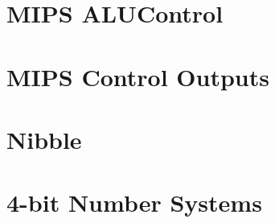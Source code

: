 \documentclass[11pt]{article}
\begin{document}
\begin{minipage}[t]{\linewidth}
    \begin{minipage}[t]{0.5\textwidth}
        \section*{MIPS ALUControl}
        
    \end{minipage}
    \begin{minipage}[t]{0.28\textwidth}
        \section*{MIPS Control Outputs}
        
    \end{minipage}
\end{minipage}

\vfill

\clearpage

\begin{minipage}[t]{0.62\linewidth}
    \begin{minipage}[t]{0.48\linewidth}
        \section*{Nibble}
        
    \end{minipage}
    \hfill
    \begin{minipage}[t]{0.48\linewidth}
        \section*{4-bit Number Systems}
        
    \end{minipage}

    \vspace{1em}

    \begin{minipage}[t]{0.64\linewidth}
        
    \end{minipage}
    \hfill
    \begin{minipage}[t]{0.32\linewidth}
        
    \end{minipage}

    \begin{minipage}[t]{\linewidth}
        
    \end{minipage}

    \vspace{1em}

    \begin{minipage}[t]{\linewidth}
        
    \end{minipage}
\end{minipage}
\hfill
\begin{minipage}[t]{0.35\linewidth}
    
\end{minipage}
\end{document}
